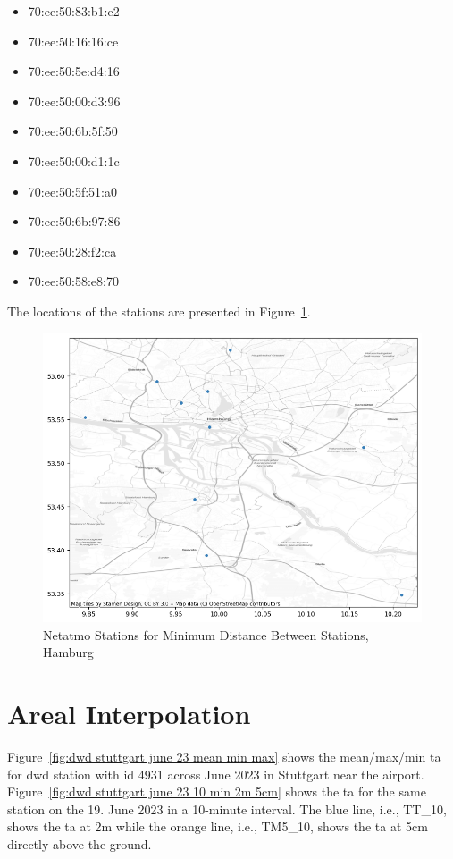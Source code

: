 \begin{itemize}
    \item 70:ee:50:83:b1:e2 
    \item 70:ee:50:16:16:ce
    \item 70:ee:50:5e:d4:16
    \item 70:ee:50:00:d3:96
    \item 70:ee:50:6b:5f:50
    \item 70:ee:50:00:d1:1c
    \item 70:ee:50:5f:51:a0
    \item 70:ee:50:6b:97:86
    \item 70:ee:50:28:f2:ca
    \item 70:ee:50:58:e8:70
\end{itemize}

The locations of the stations are presented in Figure~\ref{fig:eval_hamburg_locations_point_histb_10_map}.

\begin{figure}[ht]
    \centering
    \includegraphics[width=1\textwidth]{images/eval_hamburg_locations_point_histb_10_map.png}
    \caption{Netatmo Stations for Minimum Distance Between Stations, Hamburg}
    \label{fig:eval_hamburg_locations_point_histb_10_map}
\end{figure}

\section{Areal Interpolation}

Figure~\ref{fig:dwd stuttgart june 23 mean min max} shows the mean/max/min \gls{ta} for \gls{dwd} station with id 4931 across June 2023 in Stuttgart near the airport.
Figure~\ref{fig:dwd stuttgart june 23 10 min 2m 5cm} shows the \gls{ta} for the same station on the 19. June 2023 in a 10-minute interval. The blue line, i.e., TT\_10, shows the \gls{ta} at 2m while the orange line, i.e., TM5\_10, shows the \gls{ta} at 5cm directly above the ground.

